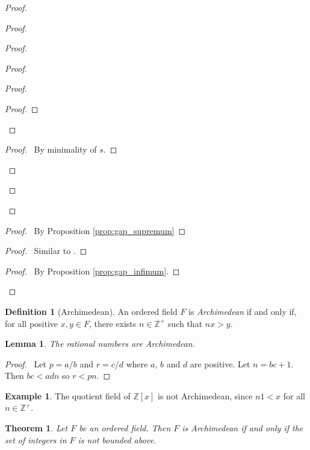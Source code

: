 \documentclass{article}
\let\qed\relax
\newtheorem{lemma}[axiom]{Lemma}
\newtheorem{theorem}[axiom]{Theorem}
\theoremstyle{definition}
\newtheorem{definition}[axiom]{Definition}
\newtheorem{example}[axiom]{Example}
\begin{document}
\begin{proof}
\begin{proof}
\begin{proof}
\begin{proof}
\begin{proof}
\begin{proof}
                        \end{proof}
                    \end{proof}
                    \begin{proof}
                        \pf\ By minimality of $s$.
                    \end{proof}
                \end{proof}
            \end{proof}
        \end{proof}
        \begin{proof}
            \pf\ By Proposition \ref{prop:gap_supremum}
        \end{proof}
        \begin{proof}
            \pf\ Similar to .
        \end{proof}
        \begin{proof}
            \pf\ By Proposition \ref{prop:gap_infimum}.
        \end{proof}
        \qed
    \end{proof}

    \begin{definition}[Archimedean]
        An ordered field $F$ is \emph{Archimedean} if and only if, for all positive $x,y \in F$, there exists
        $n \in \mathbb{Z}^+$ such that $nx > y$.
    \end{definition}

    \begin{lemma}
        \label{lemma:rationals_Archimedean}
        The rational numbers are Archimedean.
    \end{lemma}

    \begin{proof}
        \pf\ Let $p = a/b$ and $r = c/d$ where $a$, $b$ and $d$ are positive. 
        Let $n = bc+1$. Then $bc < adn$ so $r < pn$. \qed
    \end{proof}

    \begin{example}
        The quotient field of $\mathbb{Z}[x]$ is not Archimedean, since $n1 < x$ for all $n \in \mathbb{Z}^+$.
    \end{example}

    \begin{theorem}
        Let $F$ be an ordered field. Then $F$ is Archimedean if and only if the set of integers in $F$ is not
        bounded above.
    \end{theorem}
\end{document}
